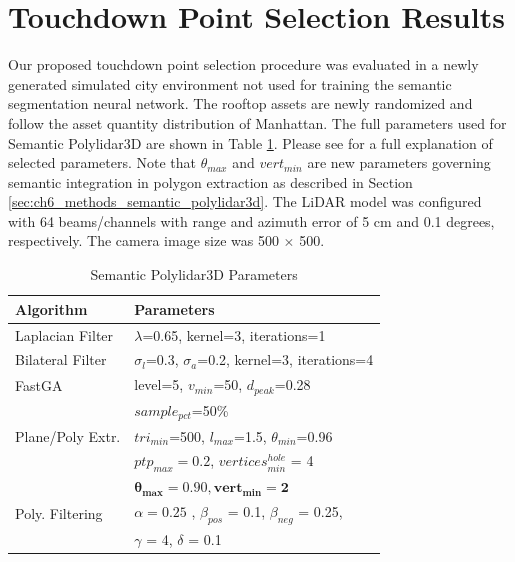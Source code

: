 \section{Touchdown Point Selection Results} \label{sec:ch6_touchdown_point_results}

Our proposed touchdown point selection procedure was evaluated in a newly generated simulated city environment not used for training the semantic segmentation neural network. The rooftop assets are newly randomized and follow the asset quantity distribution of Manhattan. The full parameters used for Semantic Polylidar3D are shown in Table \ref{table:polylidar3D_params}. Please see \cite{castagno_polylidar3d_2020} for a full explanation of selected parameters. Note that $\theta_{max}$ and $vert_{min}$ are new parameters governing semantic integration in polygon extraction as described in Section \ref{sec:ch6_methods_semantic_polylidar3d}. The LiDAR model was configured with 64 beams/channels with range and azimuth error of 5 cm and 0.1 degrees, respectively. The camera image size was 500 $\times$ 500. 

\begin{table}[ht]
\centering
\caption{Semantic Polylidar3D Parameters}\label{table:polylidar3D_params}
\begin{tabular}{@{}ll@{}}
\toprule
Algorithm        & Parameters                                                          \\ \midrule
Laplacian Filter & $\lambda$=0.65, kernel=3, iterations=1   \\
Bilateral Filter & $\sigma_l$=0.3, $\sigma_a$=0.2, kernel=3, iterations=4 \\
FastGA           & level=5,  $v_{min}$=50, $d_{peak}$=0.28            \\
                 & $sample_{pct}$=50\% \\
Plane/Poly Extr. & $tri_{min}$=500,  $l_{max}$=1.5, $\theta_{min}$=0.96 \\
                 & $ptp_{max} = 0.2$, $vertices^{hole}_{min}$ = 4  \\
                 & $\mathbf{\theta_{max} = 0.90, vert_{min}= 2}$ \\
Poly. Filtering  & $\alpha = 0.25$ , $\beta_{pos}$ = 0.1, $\beta_{neg}$ = 0.25, \\
                 & $\gamma$ = 4, $\delta$ = 0.1      \\ \bottomrule
\end{tabular}
\end{table}

